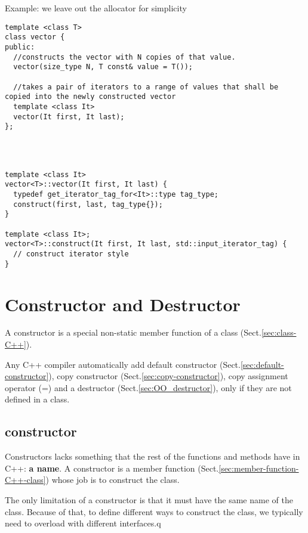 Example: we leave out the allocator for simplicity
\begin{verbatim}
template <class T>
class vector {
public:
  //constructs the vector with N copies of that value.
  vector(size_type N, T const& value = T());
  
  //takes a pair of iterators to a range of values that shall be copied into the newly constructed vector
  template <class It>
  vector(It first, It last);
};
\end{verbatim}

\begin{lstlisting}



template <class It>
vector<T>::vector(It first, It last) {
  typedef get_iterator_tag_for<It>::type tag_type;
  construct(first, last, tag_type{});
}

template <class It>;
vector<T>::construct(It first, It last, std::input_iterator_tag) {
  // construct iterator style
}
\end{lstlisting}

\section{Constructor and Destructor}
\label{sec:constructor-C++-class}

A constructor is a special non-static member function of a class
(Sect.\ref{sec:class-C++}).

Any C++ compiler automatically add default constructor
(Sect.\ref{sec:default-constructor}), copy constructor
(Sect.\ref{sec:copy-constructor}), copy assignment operator (=) and a destructor
(Sect.\ref{sec:OO_destructor}), only if they are not defined in a class.





\subsection{constructor}
\label{sec:OO_constructor}

Constructors lacks something that the rest of the functions and methods have in
C++: {\bf a name}. A constructor is a member function
(Sect.\ref{sec:member-function-C++-class}) whose job is to construct the class.

The only limitation of a constructor is that it must have the same name of the
class. Because of that, to define different ways to construct the class, we
typically need to overload with different interfaces.q

